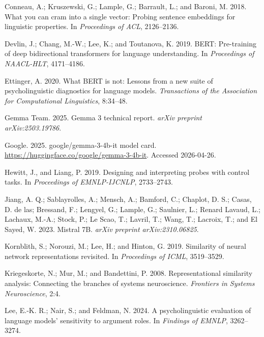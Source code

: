 \documentclass{article}
\begin{document}
\begin{thebibliography}{}

Conneau, A.; Kruszewski, G.; Lample, G.; Barrault, L.; and Baroni, M. 2018.
What you can cram into a single vector: Probing sentence embeddings for linguistic properties.
In \emph{Proceedings of ACL}, 2126--2136.

Devlin, J.; Chang, M.-W.; Lee, K.; and Toutanova, K. 2019.
BERT: Pre-training of deep bidirectional transformers for language understanding.
In \emph{Proceedings of NAACL-HLT}, 4171--4186.

Ettinger, A. 2020.
What BERT is not: Lessons from a new suite of psycholinguistic diagnostics for language models.
\emph{Transactions of the Association for Computational Linguistics}, 8:34--48.

Gemma Team. 2025.
Gemma 3 technical report.
\emph{arXiv preprint arXiv:2503.19786}.

Google. 2025.
google/gemma-3-4b-it model card.
\url{https://huggingface.co/google/gemma-3-4b-it}.
Accessed 2026-04-26.

Hewitt, J., and Liang, P. 2019.
Designing and interpreting probes with control tasks.
In \emph{Proceedings of EMNLP-IJCNLP}, 2733--2743.

Jiang, A. Q.; Sablayrolles, A.; Mensch, A.; Bamford, C.; Chaplot, D. S.; Casas, D. de las; Bressand, F.; Lengyel, G.; Lample, G.; Saulnier, L.; Renard Lavaud, L.; Lachaux, M.-A.; Stock, P.; Le Scao, T.; Lavril, T.; Wang, T.; Lacroix, T.; and El Sayed, W. 2023.
Mistral 7B.
\emph{arXiv preprint arXiv:2310.06825}.

Kornblith, S.; Norouzi, M.; Lee, H.; and Hinton, G. 2019.
Similarity of neural network representations revisited.
In \emph{Proceedings of ICML}, 3519--3529.

Kriegeskorte, N.; Mur, M.; and Bandettini, P. 2008.
Representational similarity analysis: Connecting the branches of systems neuroscience.
\emph{Frontiers in Systems Neuroscience}, 2:4.

Lee, E.-K. R.; Nair, S.; and Feldman, N. 2024.
A psycholinguistic evaluation of language models' sensitivity to argument roles.
In \emph{Findings of EMNLP}, 3262--3274.


\end{thebibliography}
\end{document}
